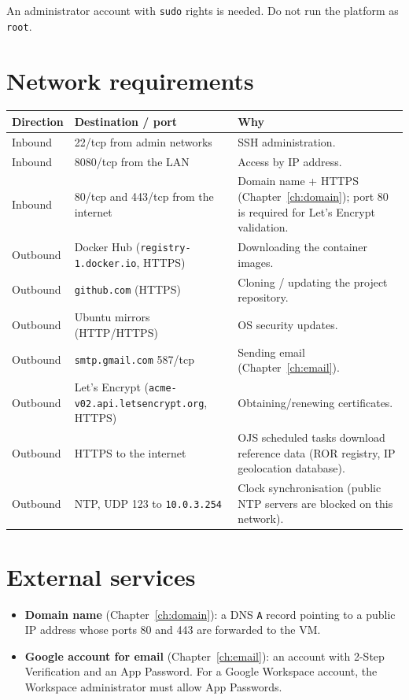 \documentclass[11pt,a4paper]{report}
\newcommand{\code}[1]{\texttt{\small #1}}
\begin{document}
An administrator account with \code{sudo} rights is needed. Do not run the platform as \code{root}.

\section{Network requirements}\label{sec:netreq}
\begin{tabularx}{\linewidth}{@{}lP{4.2cm}L@{}}
\toprule
\textbf{Direction} & \textbf{Destination / port} & \textbf{Why} \\
\midrule
Inbound  & 22/tcp from admin networks & SSH administration. \\
Inbound  & 8080/tcp from the LAN      & Access by IP address. \\
Inbound  & 80/tcp and 443/tcp from the internet & Domain name + HTTPS (Chapter~\ref{ch:domain}); port 80 is required for Let's Encrypt validation. \\
Outbound & Docker Hub (\code{registry-1.docker.io}, HTTPS) & Downloading the container images. \\
Outbound & \code{github.com} (HTTPS)     & Cloning / updating the project repository. \\
Outbound & Ubuntu mirrors (HTTP/HTTPS)  & OS security updates. \\
Outbound & \code{smtp.gmail.com} 587/tcp & Sending email (Chapter~\ref{ch:email}). \\
Outbound & Let's Encrypt (\code{acme-v02.api.\allowbreak letsencrypt.org}, HTTPS) & Obtaining/renewing certificates. \\
Outbound & HTTPS to the internet       & OJS scheduled tasks download reference data (ROR registry, IP geolocation database). \\
Outbound & NTP, UDP 123 to \code{10.0.3.254} & Clock synchronisation (public NTP servers are blocked on this network). \\
\bottomrule
\end{tabularx}

\section{External services}
\begin{itemize}
  \item \textbf{Domain name} (Chapter~\ref{ch:domain}): a DNS \code{A} record pointing to a public IP
        address whose ports 80 and 443 are forwarded to the VM.
  \item \textbf{Google account for email} (Chapter~\ref{ch:email}): an account with 2-Step Verification
        and an App Password. For a Google Workspace account, the Workspace administrator must
        allow App Passwords.
\end{itemize}
\end{document}
